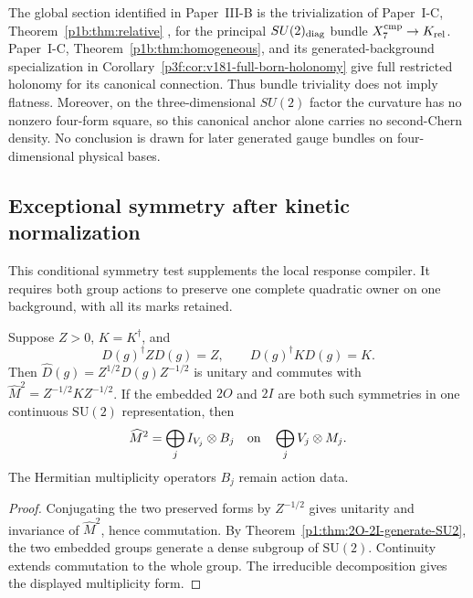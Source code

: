 \documentclass[11pt,a4paper]{article}
\begin{document}
\begin{corollary}
\label{p3f:cor:v181-trivial-bundle-nontrivial-holonomy}
The global section identified in Paper~III-B is the trivialization of
Paper~I-C, Theorem~\ref{p1b:thm:relative}
\cite{Kugelmann2026Paper1C}, for the principal
$SU(2)_{\rm diag}$ bundle $X_7^{\rm cmp}\to K_{\rm rel}$.
Paper~I-C, Theorem~\ref{p1b:thm:homogeneous}, and its generated-background
specialization in Corollary~\ref{p3f:cor:v181-full-born-holonomy} give full
restricted holonomy for its canonical connection.  Thus bundle triviality
does not imply flatness.  Moreover, on the three-dimensional $SU(2)$ factor
the curvature has no nonzero four-form square, so this canonical anchor alone
carries no second-Chern density.  No conclusion is drawn for later generated
gauge bundles on four-dimensional physical bases.
\end{corollary}




\subsection{Exceptional symmetry after kinetic normalization}
\label{p3f:app:v179-exceptional-kinetic-symmetry}

This conditional symmetry test supplements the local response compiler.
It requires both group actions to preserve one complete quadratic owner
on one background, with all its marks retained.

\begin{proposition}
\label{p3f:prop:v179-normalized-symmetry}
Suppose \(Z>0\), \(K=K^\dagger\), and
\[
 D(g)^\dagger ZD(g)=Z,\qquad D(g)^\dagger KD(g)=K.
\]
Then \(\widehat D(g)=Z^{1/2}D(g)Z^{-1/2}\) is unitary and commutes with
\(\widehat M^2=Z^{-1/2}KZ^{-1/2}\).
If the embedded \(2O\) and \(2I\) are both such symmetries in one
continuous \(\mathrm{SU}(2)\) representation, then
\[
 \widehat M^2=\bigoplus_j I_{V_j}\otimes B_j
 \quad\hbox{on}\quad\bigoplus_j V_j\otimes M_j .
\]
The Hermitian multiplicity operators \(B_j\) remain action data.
\end{proposition}
\begin{proof}
Conjugating the two preserved forms by \(Z^{-1/2}\) gives unitarity and
invariance of \(\widehat M^2\), hence commutation.  By
Theorem~\ref{p1:thm:2O-2I-generate-SU2}, the two embedded groups generate
a dense subgroup of \(\mathrm{SU}(2)\).  Continuity extends commutation
to the whole group.  The irreducible decomposition gives the displayed
multiplicity form.
\end{proof}
\end{document}
